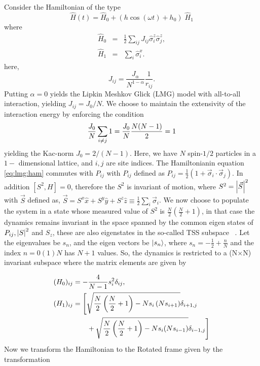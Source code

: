 \documentclass[%
reprint,
superscriptaddress,
amsmath,amssymb,
aps,
prb,
]{revtex4-2}
\begin{document}
	
	Consider the Hamiltonian of the type
	\begin{equation}
	\hat{H}(t) = \hat{H}_0 + \left(h \cos{(\omega t)} + h_0\right)\; \hat{H}_1
	\label{eq:lmg:ham}
	\end{equation}
	where
	\begin{eqnarray*}
		\hat{H}_0 &=& \frac12 \sum_{ij}J_{ij}\hat{\sigma}^z_i\hat{\sigma}^z_j,\\
		\hat{H}_1 &=& \sum_i\hat{\sigma}^x_i.
	\end{eqnarray*}
	here,
	\begin{equation*}
		J_{ij} =\frac{J_\alpha}{N^{1-\alpha}}\frac{1}{r_{ij}}.
	\end{equation*}
	Putting  $\alpha = 0$ yields the Lipkin Meshkov Glick (LMG) model with all-to-all interaction, yielding $J_{ij} = J_0/N$. We choose to maintain the extensivity of the interaction energy by enforcing the condition
	\begin{equation*}
		\frac{J_0}{N} \sum_{i\neq j}1=\frac{J_0}{N}\frac{N(N-1)}{2}=1\\
	\end{equation*}
	yielding the Kac-norm $J_0=2/(N-1)$. Here, we have $N$ spin-$1/2$ particles in a $1-$ dimensional lattice, and $i,j$ are site indices. The Hamiltonianin equation \ref{eq:lmg:ham} commutes with $P_{ij}$  with $P_{ij}$ defined as $P_{ij} = \displaystyle\frac{1}{2}(1+ \vec{\sigma}_i\cdot\vec{\sigma}_j)$. In addition $[S^2, H]=0$, therefore the $S^2$ is invariant of motion, where $S^2=\abs{\vec{S}}^2$ with $\vec{S}$ defined as, $ \vec{S}=S^x\hat{x}+S^y\hat{y}+S^z\hat{z}\equiv\frac12 \sum_i \vec{\sigma}_i$. We now choose to populate the system in a state whose  measured value of $S^2$ is $\displaystyle\frac{N}{2}\left(\frac{N}{2}+1\right)$, in that case the dynamics remains invariant in the space spanned by the common eigen states of $P_{ij}, \abs{S}^2$ and $S_z$, these are also eigenstates in the so-called TSS subspace ~\cite{mori_prethermalization_2019}. Let the eigenvalues be $s_n$, and the eigen vectors be $\ket{s_n}$, where $s_n=-\frac{1}{2}+\frac{n}{N}$ and the index
	$n= 0 (1) N$ has $N+1$ values. So, the dynamics is restricted to a (N$\times$N) invariant subspace where the matrix elements are given by 
	
	\begin{align}
		(H_0)_{ij} &= -\frac{4}{N-1} s^2_i \delta_{ij},\nonumber\\
		(H_1)_{ij} &= \Bigg[\sqrt{\frac{N}{2}\left(\frac{N}{2}+1\right) - Ns_i\left(Ns_{i + 1}\right)}\delta_{i+1, j} \nonumber\\ 
		&\hskip 0.7cm +\sqrt{\frac{N}{2}\left(\frac{N}{2}+1\right) - Ns_i(Ns_{i- 1})}\delta_{i-1,j}\Bigg]
		\label{eq:lmg:tssham}
	\end{align}
	Now we transform the Hamiltonian to the Rotated frame given by the transformation
	
\end{document}
